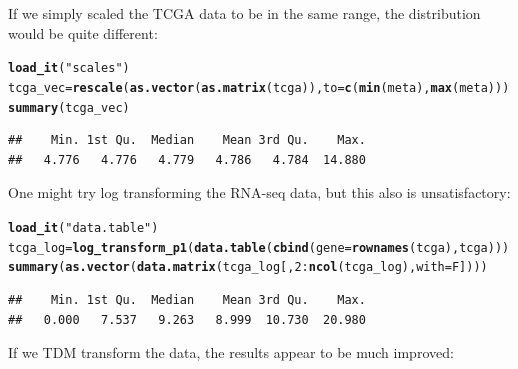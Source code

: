 \documentclass{article}\usepackage[]{graphicx}\usepackage[]{color}
\makeatletter
\newcommand{\hlnum}[1]{\textcolor[rgb]{0.686,0.059,0.569}{#1}}%
\newcommand{\hlstr}[1]{\textcolor[rgb]{0.192,0.494,0.8}{#1}}%
\newcommand{\hlopt}[1]{\textcolor[rgb]{0,0,0}{#1}}%
\newcommand{\hlstd}[1]{\textcolor[rgb]{0.345,0.345,0.345}{#1}}%
\newcommand{\hlkwb}[1]{\textcolor[rgb]{0.69,0.353,0.396}{#1}}%
\newcommand{\hlkwc}[1]{\textcolor[rgb]{0.333,0.667,0.333}{#1}}%
\newcommand{\hlkwd}[1]{\textcolor[rgb]{0.737,0.353,0.396}{\textbf{#1}}}%
\newenvironment{kframe}{%
 \def\at@end@of@kframe{}%
 \ifinner\ifhmode%
  \def\at@end@of@kframe{\end{minipage}}%
  \begin{minipage}{\columnwidth}%
 \fi\fi%
 \def\FrameCommand##1{\hskip\@totalleftmargin \hskip-\fboxsep
 \colorbox{shadecolor}{##1}\hskip-\fboxsep
     \hskip-\linewidth \hskip-\@totalleftmargin \hskip\columnwidth}%
 \MakeFramed {\advance\hsize-\width
   \@totalleftmargin\z@ \linewidth\hsize
   \@setminipage}}%
 {\par\unskip\endMakeFramed%
 \at@end@of@kframe}
\newenvironment{knitrout}{}{} %
\makeatother
\begin{document}
If we simply scaled the TCGA data to be in the same range, the distribution
would be quite different:

\begin{knitrout}
\color{fgcolor}\begin{kframe}
\begin{alltt}
\hlkwd{load_it}\hlstd{(}\hlstr{"scales"}\hlstd{)}
\hlstd{tcga_vec} \hlkwb{=} \hlkwd{rescale}\hlstd{(}\hlkwd{as.vector}\hlstd{(}\hlkwd{as.matrix}\hlstd{(tcga)),} \hlkwc{to}\hlstd{=}\hlkwd{c}\hlstd{(}\hlkwd{min}\hlstd{(meta),} \hlkwd{max}\hlstd{(meta)))}
\hlkwd{summary}\hlstd{(tcga_vec)}
\end{alltt}
\begin{verbatim}
##    Min. 1st Qu.  Median    Mean 3rd Qu.    Max. 
##   4.776   4.776   4.779   4.786   4.784  14.880
\end{verbatim}
\end{kframe}
\end{knitrout}

One might try log transforming the RNA-seq data, but this also is
unsatisfactory:

\begin{knitrout}
\color{fgcolor}\begin{kframe}
\begin{alltt}
\hlkwd{load_it}\hlstd{(}\hlstr{"data.table"}\hlstd{)}
\hlstd{tcga_log} \hlkwb{=} \hlkwd{log_transform_p1}\hlstd{(}\hlkwd{data.table}\hlstd{(}\hlkwd{cbind}\hlstd{(}\hlkwc{gene}\hlstd{=}\hlkwd{rownames}\hlstd{(tcga), tcga)))}
\hlkwd{summary}\hlstd{(}\hlkwd{as.vector}\hlstd{(}\hlkwd{data.matrix}\hlstd{(tcga_log[,}\hlnum{2}\hlopt{:}\hlkwd{ncol}\hlstd{(tcga_log),}\hlkwc{with}\hlstd{=F])))}
\end{alltt}
\begin{verbatim}
##    Min. 1st Qu.  Median    Mean 3rd Qu.    Max. 
##   0.000   7.537   9.263   8.999  10.730  20.980
\end{verbatim}
\end{kframe}
\end{knitrout}

If we TDM transform the data, the results appear to be much improved:
\end{document}

